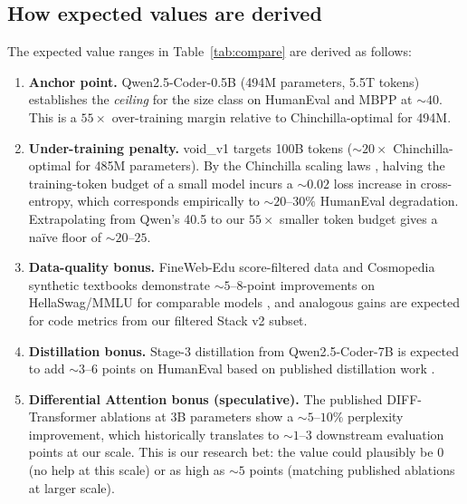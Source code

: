 \documentclass[11pt,a4paper]{article}
\theoremstyle{definition}
\theoremstyle{remark}
\begin{document}
\subsection{How expected values are derived}
\label{sec:expected-range}

The expected value ranges in Table~\ref{tab:compare} are derived as follows:

\begin{enumerate}[leftmargin=1.5em,itemsep=0.2em]
    \item \textbf{Anchor point.} Qwen2.5-Coder-0.5B (494M parameters, 5.5T
          tokens) establishes the \emph{ceiling} for the size class on
          HumanEval and MBPP at $\sim 40$. This is a $55 \times$ over-training
          margin relative to Chinchilla-optimal for 494M.
    \item \textbf{Under-training penalty.} void\_v1 targets 100B tokens
          ($\sim 20 \times$ Chinchilla-optimal for 485M parameters). By the
          Chinchilla scaling laws \citep{hoffmann2022training}, halving
          the training-token budget of a small model incurs a
          $\sim 0.02$ loss increase in cross-entropy, which corresponds
          empirically to $\sim 20$--$30\%$ HumanEval degradation. Extrapolating
          from Qwen's 40.5 to our $55 \times$ smaller token budget gives a
          na\"ive floor of $\sim 20$--$25$.
    \item \textbf{Data-quality bonus.} FineWeb-Edu score-filtered data and
          Cosmopedia synthetic textbooks demonstrate $\sim 5$--$8$-point
          improvements on HellaSwag/MMLU for comparable models
          \citep{allal2025smollm2}, and analogous gains are expected for
          code metrics from our filtered Stack v2 subset.
    \item \textbf{Distillation bonus.} Stage-3 distillation from
          Qwen2.5-Coder-7B is expected to add $\sim 3$--$6$ points on
          HumanEval based on published distillation work
          \citep{team2024gemma2}.
    \item \textbf{Differential Attention bonus (speculative).} The
          published DIFF-Transformer ablations at 3B parameters show a
          $\sim 5$--$10\%$ perplexity improvement, which historically
          translates to $\sim 1$--$3$ downstream evaluation points at
          our scale. This is our research bet: the value could plausibly
          be 0 (no help at this scale) or as high as $\sim 5$ points
          (matching published ablations at larger scale).
\end{enumerate}
\end{document}
